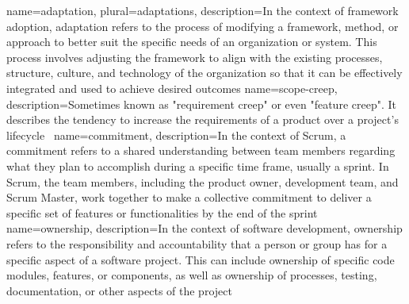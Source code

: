{
    name={adaptation},
    plural={adaptations},
    description={In the context of framework adoption, adaptation refers to the process of modifying a framework, method, or approach to better suit the specific needs of an organization or system. This process involves adjusting the framework to align with the existing processes, structure, culture, and technology of the organization so that it can be effectively integrated and used to achieve desired outcomes}
}
{
    name={scope-creep},
    description={Sometimes known as "requirement creep" or even "feature creep". It describes the tendency to increase the requirements of a product over a project's lifecycle~\cite{ProjectManagementQualification2019SCD}}
}
{
    name={commitment},
    description={In the context of Scrum, a commitment refers to a shared understanding between team members regarding what they plan to accomplish during a specific time frame, usually a sprint. In Scrum, the team members, including the product owner, development team, and Scrum Master, work together to make a collective commitment to deliver a specific set of features or functionalities by the end of the sprint~\cite{Schneider2018WbC}}
}
{
    name={ownership},
    description={In the context of software development, ownership refers to the responsibility and accountability that a person or group has for a specific aspect of a software project. This can include ownership of specific code modules, features, or components, as well as ownership of processes, testing, documentation, or other aspects of the project~\cite{scrumdictionary.comPO}}
}

